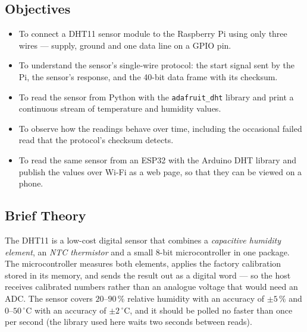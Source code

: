 \documentclass[10pt,a4paper]{article}
\begin{document}
\subsection*{Objectives}
\begin{itemize}
  \item To connect a DHT11 sensor module to the Raspberry Pi using only three wires ---
        supply, ground and one data line on a GPIO pin.
  \item To understand the sensor's single-wire protocol: the start signal sent by the
        Pi, the sensor's response, and the 40-bit data frame with its checksum.
  \item To read the sensor from Python with the \texttt{adafruit\_dht} library and
        print a continuous stream of temperature and humidity values.
  \item To observe how the readings behave over time, including the occasional failed
        read that the protocol's checksum detects.
  \item To read the same sensor from an ESP32 with the Arduino DHT library and publish
        the values over Wi-Fi as a web page, so that they can be viewed on a phone.
\end{itemize}

\subsection*{Brief Theory}
The DHT11 is a low-cost digital sensor that combines a \emph{capacitive humidity
element}, an \emph{NTC thermistor} and a small 8-bit microcontroller in one package.
The microcontroller measures both elements, applies the factory calibration stored in
its memory, and sends the result out as a digital word --- so the host receives
calibrated numbers rather than an analogue voltage that would need an ADC. The sensor
covers $20$--$90\,\%$ relative humidity with an accuracy of $\pm5\,\%$ and
$0$--$50\,^{\circ}\mathrm{C}$ with an accuracy of $\pm2\,^{\circ}\mathrm{C}$, and
it should be polled no faster than once per second (the library used here waits
two seconds between reads).
\end{document}
